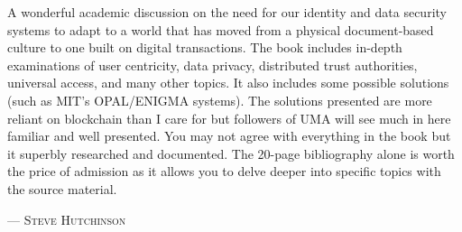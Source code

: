 A wonderful academic discussion on the need for our identity and data security systems to adapt to a world that has moved from a physical document-based culture to one built on digital transactions. The book includes in-depth examinations of user centricity, data privacy, distributed trust authorities, universal access, and many other topics. It also includes some possible solutions (such as MIT’s OPAL/ENIGMA systems). The solutions presented are more reliant on blockchain than I care for but followers of UMA will see much in here familiar and well presented. You may not agree with everything in the book but it superbly researched and documented. The 20-page bibliography alone is worth the price of admission as it allows you to delve deeper into specific topics with the source material. 
\setlength{\parindent}{0cm}\par\textsc{ --- Steve Hutchinson }\par\vspace{12pt}\setlength{\parindent}{15pt}
